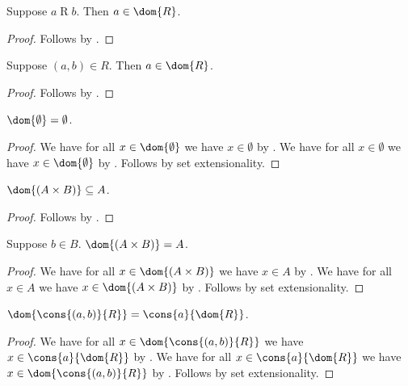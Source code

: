 \begin{proposition}\label{dom_intro}
    Suppose $a\mathrel{R} b$.
    Then $a\in\dom{R}$.
\end{proposition}
\begin{proof}
    Follows by .
\end{proof}

\begin{classification}\label{dom_pair_intro}
    Suppose $(a,b)\in R$.
    Then $a\in\dom{R}$.
\end{classification}
\begin{proof}
    Follows by .
\end{proof}

\begin{proposition}\label{dom_emptyset}
    $\dom{\emptyset} = \emptyset$.
\end{proposition}
\begin{proof}
    We have for all $x\in\dom{\emptyset}$ we have $x\in\emptyset$
        by .
    We have for all $x\in\emptyset$ we have $x\in\dom{\emptyset}$
        by .
    Follows by set extensionality.
\end{proof}

\begin{proposition}\label{dom_times}
    $\dom{(A\times B)}\subseteq A$.
\end{proposition}
\begin{proof}
    Follows by .
\end{proof}

\begin{proposition}\label{dom_times_inhabited}
    Suppose $b\in B$.
    $\dom{(A\times B)} = A$.
\end{proposition}
\begin{proof}
    We have for all $x\in\dom{(A\times B)}$ we have $x\in A$
        by .
    We have for all $x\in A$ we have $x\in\dom{(A\times B)}$
        by .
    Follows by set extensionality.
\end{proof}

\begin{proposition}\label{dom_cons}
    $\dom{\cons{(a,b)}{R}} = \cons{a}{\dom{R}}$.
\end{proposition}
\begin{proof}
    We have for all $x\in\dom{\cons{(a,b)}{R}}$
        we have $x\in\cons{a}{\dom{R}}$
        by .
    We have for all $x\in\cons{a}{\dom{R}}$
        we have $x\in\dom{\cons{(a,b)}{R}}$
        by .
    Follows by set extensionality.
\end{proof}

